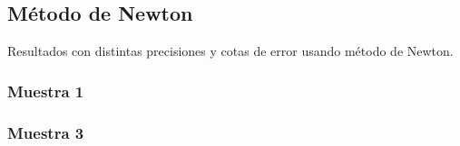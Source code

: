 \documentclass[a4paper,10pt,twoside]{article}
\begin{document}




\subsection{Método de Newton}
Resultados con distintas precisiones y cotas de error usando  método de Newton.

\subsubsection{Muestra 1}


\subsubsection{Muestra 3}



\end{document}
